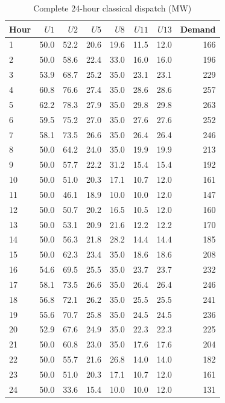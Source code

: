 \documentclass{apmcmthesis}
\begin{document}
\begin{table}[htbp]
    \centering
    \caption{Complete 24-hour classical dispatch (MW)}
    \label{tab:q1_dispatch}
    \begin{tabular}{@{}lrrrrrrr@{}}
        \toprule
        Hour & $U1$ & $U2$ & $U5$ & $U8$ & $U11$ & $U13$ & Demand \\
        \midrule
        1 & 50.0 & 52.2 & 20.6 & 19.6 & 11.5 & 12.0 & 166 \\
        2 & 50.0 & 58.6 & 22.4 & 33.0 & 16.0 & 16.0 & 196 \\
        3 & 53.9 & 68.7 & 25.2 & 35.0 & 23.1 & 23.1 & 229 \\
        4 & 60.8 & 76.6 & 27.4 & 35.0 & 28.6 & 28.6 & 257 \\
        5 & 62.2 & 78.3 & 27.9 & 35.0 & 29.8 & 29.8 & 263 \\
        6 & 59.5 & 75.2 & 27.0 & 35.0 & 27.6 & 27.6 & 252 \\
        7 & 58.1 & 73.5 & 26.6 & 35.0 & 26.4 & 26.4 & 246 \\
        8 & 50.0 & 64.2 & 24.0 & 35.0 & 19.9 & 19.9 & 213 \\
        9 & 50.0 & 57.7 & 22.2 & 31.2 & 15.4 & 15.4 & 192 \\
        10 & 50.0 & 51.0 & 20.3 & 17.1 & 10.7 & 12.0 & 161 \\
        11 & 50.0 & 46.1 & 18.9 & 10.0 & 10.0 & 12.0 & 147 \\
        12 & 50.0 & 50.7 & 20.2 & 16.5 & 10.5 & 12.0 & 160 \\
        13 & 50.0 & 53.1 & 20.9 & 21.6 & 12.2 & 12.2 & 170 \\
        14 & 50.0 & 56.3 & 21.8 & 28.2 & 14.4 & 14.4 & 185 \\
        15 & 50.0 & 62.3 & 23.4 & 35.0 & 18.6 & 18.6 & 208 \\
        16 & 54.6 & 69.5 & 25.5 & 35.0 & 23.7 & 23.7 & 232 \\
        17 & 58.1 & 73.5 & 26.6 & 35.0 & 26.4 & 26.4 & 246 \\
        18 & 56.8 & 72.1 & 26.2 & 35.0 & 25.5 & 25.5 & 241 \\
        19 & 55.6 & 70.7 & 25.8 & 35.0 & 24.5 & 24.5 & 236 \\
        20 & 52.9 & 67.6 & 24.9 & 35.0 & 22.3 & 22.3 & 225 \\
        21 & 50.0 & 60.8 & 23.0 & 35.0 & 17.6 & 17.6 & 204 \\
        22 & 50.0 & 55.7 & 21.6 & 26.8 & 14.0 & 14.0 & 182 \\
        23 & 50.0 & 51.0 & 20.3 & 17.1 & 10.7 & 12.0 & 161 \\
        24 & 50.0 & 33.6 & 15.4 & 10.0 & 10.0 & 12.0 & 131 \\
        \bottomrule
    \end{tabular}
\end{table}
\end{document}
